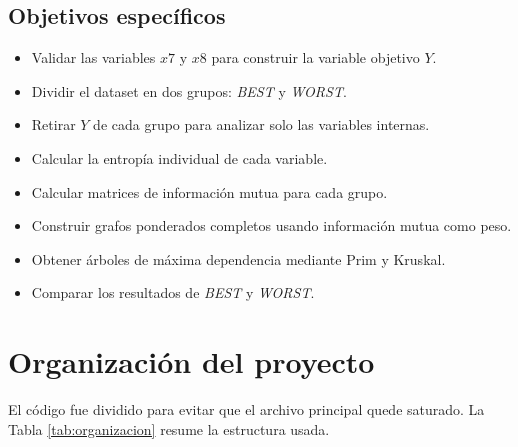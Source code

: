 \documentclass[12pt,a4paper]{article}
\begin{document}
\subsection{Objetivos específicos}

\begin{itemize}
    \item Validar las variables \(x7\) y \(x8\) para construir la variable objetivo \(Y\).
    \item Dividir el dataset en dos grupos: \textit{BEST} y \textit{WORST}.
    \item Retirar \(Y\) de cada grupo para analizar solo las variables internas.
    \item Calcular la entropía individual de cada variable.
    \item Calcular matrices de información mutua para cada grupo.
    \item Construir grafos ponderados completos usando información mutua como peso.
    \item Obtener árboles de máxima dependencia mediante Prim y Kruskal.
    \item Comparar los resultados de \textit{BEST} y \textit{WORST}.
\end{itemize}

\section{Organización del proyecto}

El código fue dividido para evitar que el archivo principal quede saturado. La Tabla \ref{tab:organizacion} resume la estructura usada.
\end{document}
